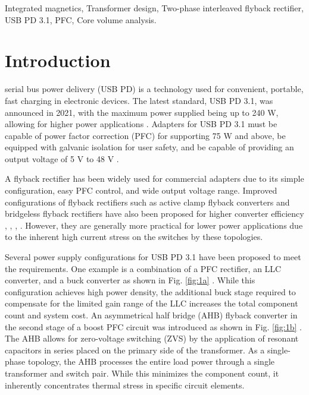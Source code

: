 \documentclass[lettersize,journal]{IEEEtran}
\begin{document}
\begin{IEEEkeywords}
Integrated magnetics, Transformer design, Two-phase interleaved flyback rectifier, USB PD 3.1, PFC, Core volume analysis.
\end{IEEEkeywords}

\section{Introduction}
 serial bus power delivery (USB PD) is a technology used for convenient, portable, fast charging in electronic devices. The latest standard, USB PD 3.1, was announced in 2021, with the maximum power supplied being up to 240 W, allowing for higher power applications \cite{ref1}. Adapters for USB PD 3.1 must be capable of power factor correction (PFC) for supporting 75 W and above, be equipped with galvanic isolation for user safety, and be capable of providing an output voltage of 5 V to 48 V \cite{ref2}.

A flyback rectifier has been widely used for commercial adapters due to its simple configuration, easy PFC control, and wide output voltage range. Improved configurations of flyback rectifiers such as active clamp flyback converters \cite{ref6, ref7} and bridgeless flyback rectifiers have also been proposed for higher converter efficiency \cite{ref8}, \cite{ref9}, \cite{ref10}, \cite{ref11}. However, they are generally more practical for lower power applications due to the inherent high current stress on the switches by these topologies. 

Several power supply configurations for USB PD 3.1 have been proposed to meet the requirements. One example is a combination of a PFC rectifier, an LLC converter, and a buck converter as shown in Fig. \ref{fig:1a} \cite{ref3, ref4}. While this configuration achieves high power density, the additional buck stage required to compensate for the limited gain range of the LLC increases the total component count and system cost. An asymmetrical half bridge (AHB) flyback converter in the second stage of a boost PFC circuit was introduced as shown in Fig. \ref{fig:1b} \cite{ref5}. The AHB allows for zero-voltage switching (ZVS) by the application of resonant capacitors in series placed on the primary side of the transformer. As a single-phase topology, the AHB processes the entire load power through a single transformer and switch pair. While this minimizes the component count, it inherently concentrates thermal stress in specific circuit elements.
\end{document}
